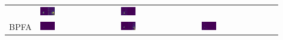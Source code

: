 \begin{tabular}{m{}*{3}{M{0.21\textwidth}}}
&\includegraphics[width=0.2\textwidth]{img/chapitre4/figure15/synth_hole/SynthH_wKSVD_matlab_band_1.png}
&\includegraphics[width=0.2\textwidth]{img/chapitre4/figure15/synth_hole/SynthH_wKSVD_matlab_band_2.png}
\\
BPFA
&\includegraphics[width=0.2\textwidth]{img/chapitre4/figure15/synth_hole/SynthH_BPFA_matlab_band_0.png}
&\includegraphics[width=0.2\textwidth]{img/chapitre4/figure15/synth_hole/SynthH_BPFA_matlab_band_1.png}
&\includegraphics[width=0.2\textwidth]{img/chapitre4/figure15/synth_hole/SynthH_BPFA_matlab_band_2.png}
\\
\end{tabular}